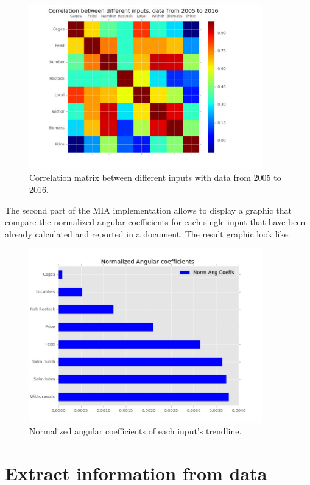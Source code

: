 \begin{figure}[H]
	\centering
    \includegraphics[width=0.90\textwidth]{Files/Total_Dataset_Years_Matrix.pdf}
    \caption{Correlation matrix between different inputs with data from 2005 to 2016.}
\end{figure}

\newpage

The second part of the MIA implementation allows to display a graphic that compare the normalized angular coefficients for each single input that have been already calculated and reported in a document. The result graphic look like:

\begin{figure}[H]
	\centering
    \includegraphics[width=0.90\textwidth]{Files/Norm_Ang_Coeffs.jpg}
    \caption{Normalized angular coefficients of each input's trendline.}
\end{figure}


\newpage
\section{Extract information from data}
